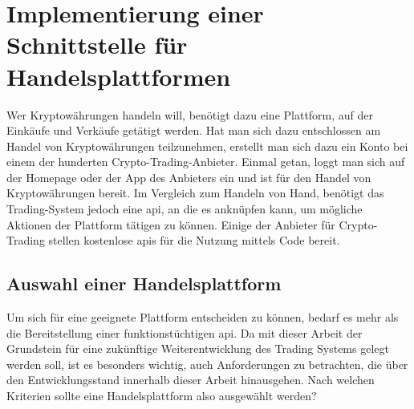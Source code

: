 \documentclass[oneside]{ausarbeitung}
\begin{document}
\section{Implementierung einer Schnittstelle für Handelsplattformen}
\label{sec:schnittstelle_handelsplatform}

Wer Kryptowährungen handeln will, benötigt dazu eine Plattform, auf der Einkäufe und Verkäufe getätigt werden. Hat man sich dazu entschlossen am Handel von Kryptowährungen teilzunehmen, erstellt man sich dazu ein Konto bei einem der hunderten Crypto-Trading-Anbieter. Einmal getan, loggt man sich auf der Homepage oder der App des Anbieters ein und ist für den Handel von Kryptowährungen bereit. Im Vergleich zum Handeln von Hand, benötigt das Trading-System jedoch eine \ac{api}, an die es anknüpfen kann, um mögliche Aktionen der Plattform tätigen zu können. Einige der Anbieter für Crypto-Trading stellen kostenlose \ac{api}s für die Nutzung mittels Code bereit.

\subsection{Auswahl einer Handelsplattform}
\label{sub:auswahl_plattform}

Um sich für eine geeignete Plattform entscheiden zu können, bedarf es mehr als die Bereitstellung einer funktionstüchtigen \ac{api}. Da mit dieser Arbeit der Grundstein für eine zukünftige Weiterentwicklung des Trading Systems gelegt werden soll, ist es besonders wichtig, auch Anforderungen zu betrachten, die über den Entwicklungsstand innerhalb dieser Arbeit hinausgehen. Nach welchen Kriterien sollte eine Handelsplattform also ausgewählt werden? \\
\end{document}
